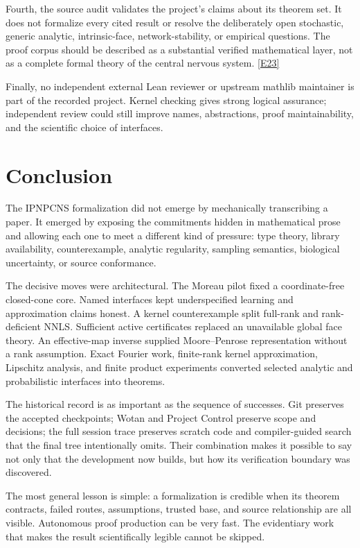 \documentclass[11pt,a4paper]{article}
\newcommand{\ev}[1]{%
  \hyperref[ev:#1]{\textcolor{ReportBlue}{\textsf{\scriptsize[#1]}}}}
\begin{document}
Fourth, the source audit validates the project's claims about its theorem set. It
does not formalize every cited result or resolve the deliberately open stochastic,
generic analytic, intrinsic-face, network-stability, or empirical questions. The
proof corpus should be described as a substantial verified mathematical layer, not
as a complete formal theory of the central nervous system. \ev{E23}

Finally, no independent external Lean reviewer or upstream mathlib maintainer is part
of the recorded project. Kernel checking gives strong logical assurance; independent
review could still improve names, abstractions, proof maintainability, and the
scientific choice of interfaces.

\section{Conclusion}
\label{sec:conclusion}

The IPNPCNS formalization did not emerge by mechanically transcribing a paper. It
emerged by exposing the commitments hidden in mathematical prose and allowing each
one to meet a different kind of pressure: type theory, library availability,
counterexample, analytic regularity, sampling semantics, biological uncertainty, or
source conformance.

The decisive moves were architectural. The Moreau pilot fixed a coordinate-free
closed-cone core. Named interfaces kept underspecified learning and approximation
claims honest. A kernel counterexample split full-rank and rank-deficient NNLS.
Sufficient active certificates replaced an unavailable global face theory. An
effective-map inverse supplied Moore--Penrose representation without a rank
assumption. Exact Fourier work, finite-rank kernel approximation, Lipschitz analysis,
and finite product experiments converted selected analytic and probabilistic
interfaces into theorems.

The historical record is as important as the sequence of successes. Git preserves
the accepted checkpoints; Wotan and Project Control preserve scope and decisions;
the full session trace preserves scratch code and compiler-guided search that the
final tree intentionally omits. Their combination makes it possible to say not only
that the development now builds, but how its verification boundary was discovered.

The most general lesson is simple: a formalization is credible when its theorem
contracts, failed routes, assumptions, trusted base, and source relationship are all
visible. Autonomous proof production can be very fast. The evidentiary work that
makes the result scientifically legible cannot be skipped.
\end{document}
